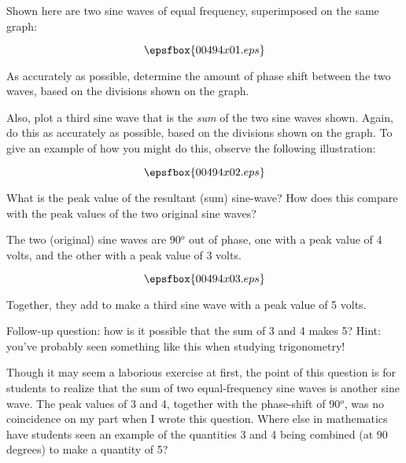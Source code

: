 

Shown here are two sine waves of equal frequency, superimposed on the same graph:

$$\epsfbox{00494x01.eps}$$

As accurately as possible, determine the amount of phase shift between the two waves, based on the divisions shown on the graph.

Also, plot a third sine wave that is the {\it sum} of the two sine waves shown.  Again, do this as accurately as possible, based on the divisions shown on the graph.  To give an example of how you might do this, observe the following illustration:

$$\epsfbox{00494x02.eps}$$

What is the peak value of the resultant (sum) sine-wave?  How does this compare with the peak values of the two original sine waves?







The two (original) sine waves are 90$^{o}$ out of phase, one with a peak value of 4 volts, and the other with a peak value of 3 volts.

$$\epsfbox{00494x03.eps}$$

Together, they add to make a third sine wave with a peak value of 5 volts.

\vskip 10pt

Follow-up question: how is it possible that the sum of 3 and 4 makes 5?  Hint: you've probably seen something like this when studying trigonometry!







Though it may seem a laborious exercise at first, the point of this question is for students to realize that the sum of two equal-frequency sine waves is another sine wave.  The peak values of 3 and 4, together with the phase-shift of 90$^{o}$, was no coincidence on my part when I wrote this question.  Where else in mathematics have students seen an example of the quantities 3 and 4 being combined (at 90 degrees) to make a quantity of 5?




